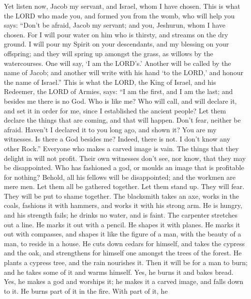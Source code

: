  Yet listen now, Jacob my servant, and Israel, whom I have
chosen.  This is what the LORD who made you, and formed
you from the womb, who will help you says: ``Don't be afraid, Jacob my
servant; and you, Jeshurun, whom I have chosen.  For I
will pour water on him who is thirsty, and streams on the dry ground. I
will pour my Spirit on your descendants, and my blessing on your
offspring;  and they will spring up amongst the grass, as
willows by the watercourses.  One will say, `I am the
LORD's.' Another will be called by the name of Jacob; and another will
write with his hand `to the LORD,' and honour the name of Israel.''
 This is what the LORD, the King of Israel, and his
Redeemer, the LORD of Armies, says: ``I am the first, and I am the last;
and besides me there is no God.  Who is like me? Who will
call, and will declare it, and set it in order for me, since I
established the ancient people? Let them declare the things that are
coming, and that will happen.  Don't fear, neither be
afraid. Haven't I declared it to you long ago, and shown it? You are my
witnesses. Is there a God besides me? Indeed, there is not. I don't know
any other Rock.''  Everyone who makes a carved image is
vain. The things that they delight in will not profit. Their own
witnesses don't see, nor know, that they may be disappointed.
 Who has fashioned a god, or moulds an image that is
profitable for nothing?  Behold, all his fellows will be
disappointed; and the workmen are mere men. Let them all be gathered
together. Let them stand up. They will fear. They will be put to shame
together.  The blacksmith takes an axe, works in the
coals, fashions it with hammers, and works it with his strong arm. He is
hungry, and his strength fails; he drinks no water, and is faint.
 The carpenter stretches out a line. He marks it out with
a pencil. He shapes it with planes. He marks it out with compasses, and
shapes it like the figure of a man, with the beauty of a man, to reside
in a house.  He cuts down cedars for himself, and takes
the cypress and the oak, and strengthens for himself one amongst the
trees of the forest. He plants a cypress tree, and the rain nourishes
it.  Then it will be for a man to burn; and he takes some
of it and warms himself. Yes, he burns it and bakes bread. Yes, he makes
a god and worships it; he makes it a carved image, and falls down to it.
 He burns part of it in the fire. With part of it, he
